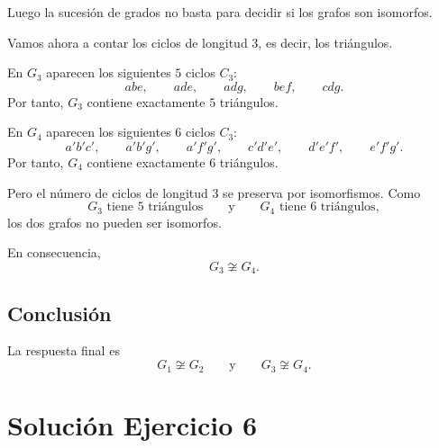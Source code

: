 \documentclass[12pt]{article}
\begin{document}
Luego la sucesión de grados no basta para decidir si los grafos son isomorfos.

Vamos ahora a contar los ciclos de longitud \(3\), es decir, los triángulos.

En \(G_3\) aparecen los siguientes \(5\) ciclos \(C_3\):
\[
a b e,\qquad a d e,\qquad a d g,\qquad b e f,\qquad c d g.
\]
Por tanto, \(G_3\) contiene exactamente \(5\) triángulos.

En \(G_4\) aparecen los siguientes \(6\) ciclos \(C_3\):
\[
a'b'c',\qquad a'b'g',\qquad a'f'g',\qquad c'd'e',\qquad d'e'f',\qquad e'f'g'.
\]
Por tanto, \(G_4\) contiene exactamente \(6\) triángulos.

Pero el número de ciclos de longitud \(3\) se preserva por isomorfismos. Como
\[
G_3 \text{ tiene } 5 \text{ triángulos}
\qquad \text{y} \qquad
G_4 \text{ tiene } 6 \text{ triángulos},
\]
los dos grafos no pueden ser isomorfos.

En consecuencia,
\[
\boxed{G_3 \not\cong G_4.}
\]

\subsection*{Conclusión}

La respuesta final es
\[
\boxed{G_1 \not\cong G_2 \qquad \text{y} \qquad G_3 \not\cong G_4.}
\]

\section*{Solución Ejercicio 6}
\end{document}
